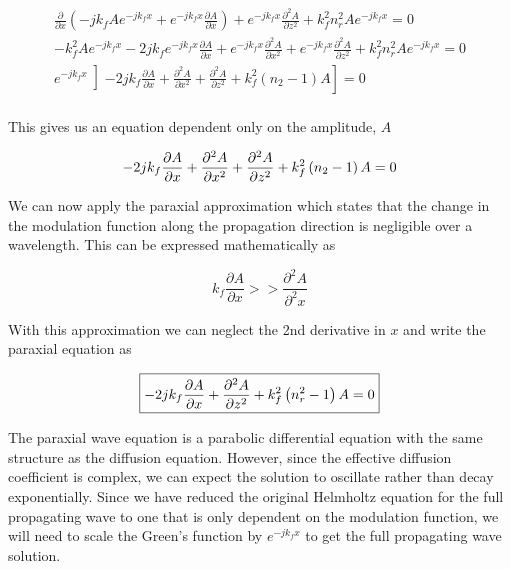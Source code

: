  \begin{equation}
 \begin{gathered}
\frac{\partial }{\partial x}\left(-jk_fAe^{-jk_fx}+e^{-jk_fx}\frac{\partial A}{\partial x} \right) + e^{-jk_fx}\frac{\partial^2 A}{\partial z^2} + k_f^2n_r^2 Ae^{-jk_fx} = 0 \\
-k_f^2Ae^{-jk_fx} -2jk_fe^{-jk_fx}\frac{\partial A}{\partial x}+e^{-jk_fx}\frac{\partial^2 A}{\partial x^2} + e^{-jk_fx}\frac{\partial^2 A}{\partial z^2} + k_f^2n_r^2 Ae^{-jk_fx} = 0 \\
e^{-jk_fx}\left] -2jk_f\frac{\partial A}{\partial x}+\frac{\partial^2 A}{\partial x^2} + \frac{\partial^2 A}{\partial z^2} + k_f^2\left(n_2-1\right)A\right] = 0 \\
\end{gathered}
\label{gf_eq:41a}
\end{equation}
\renewcommand{\baselinestretch}{2} \small\normalsize
 
\noindent This gives us an equation dependent only on the amplitude, $A$

 \begin{equation}
-2jk_f\frac{\partial A}{\partial x}+\frac{\partial^2 A}{\partial x^2} + \frac{\partial^2 A}{\partial z^2} + k_f^2\left(n_2-1\right)A= 0 \\
\label{gf_eq:42}
\end{equation}
 \renewcommand{\baselinestretch}{2} \small\normalsize
 
 We can now apply the paraxial approximation which states that the change in the modulation function along the propagation direction is negligible over a wavelength. This can be expressed mathematically as
 
  \begin{equation}
k_f\frac{\partial A}{\partial x} >> \frac{\partial^2 A}{\partial^2 x}
\label{gf_eq:43}
\end{equation}
 \renewcommand{\baselinestretch}{2} \small\normalsize
 
 With this approximation we can neglect the 2nd derivative in $x$ and write the paraxial equation as
 
\begin{equation}
\boxed{-2jk_f\frac{\partial A}{\partial x} + \frac{\partial^2 A}{\partial z^2} +k_f^2\left(n_r^2-1\right)A= 0} \\
\label{gf_eq:44}
\end{equation}
\renewcommand{\baselinestretch}{2} \small\normalsize
 
The paraxial wave equation is a parabolic differential equation with the same structure as the diffusion equation. However, since the effective diffusion coefficient is complex, we can expect the solution to oscillate rather than decay exponentially. Since we have reduced the original Helmholtz equation for the full propagating wave to one that is only dependent on the modulation function, we will need to scale the Green's function by $e^{-jk_fx}$ to get the full propagating wave solution.
 
